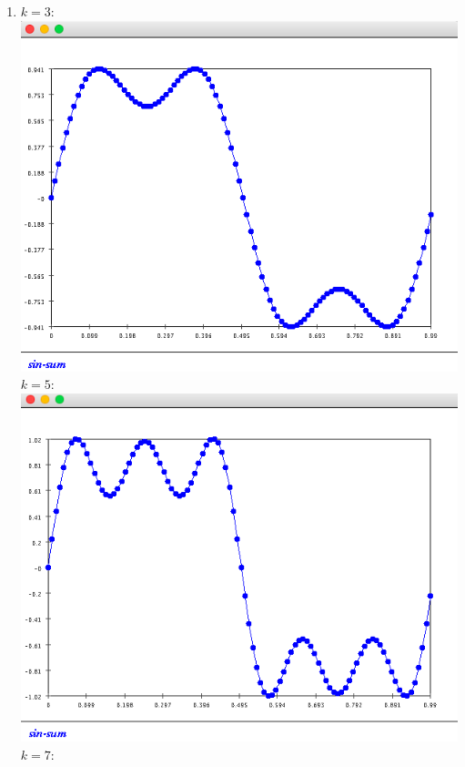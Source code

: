 \documentclass{article}
\begin{document}
\begin{enumerate}
\item $k=3:$ \\
\includegraphics[scale=0.3]{exercise5_k3}\\
$k=5:$ \\
\includegraphics[scale=0.3]{exercise5_k5}\\
$k=7:$ \\

\end{enumerate}
\end{document}
